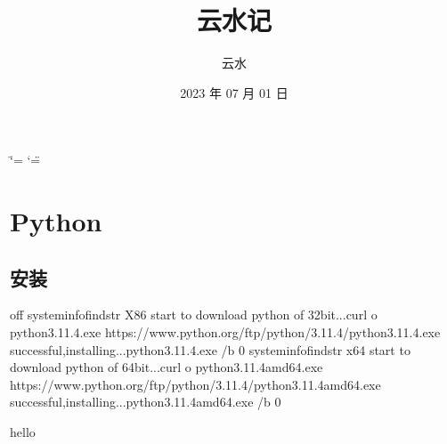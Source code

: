 \documentclass[letterpaper,10pt,english]{sphinxmanual}
\title{云水记}
\date{2023 年 07 月 01 日}
\author{云水}
\begin{document}
\ifdefined\shorthandoff
  \ifnum\catcode`\=\string=\active\shorthandoff{=}\fi
  \ifnum\catcode`\"=\active{}\fi
\fi

\pagestyle{empty}
\sphinxmaketitle
\pagestyle{plain}
\sphinxtableofcontents
\pagestyle{normal}
\label{\detokenize{index::doc}}


\sphinxstepscope


\chapter{Python}
\label{\detokenize{notes/program/python/index:python}}\label{\detokenize{notes/program/python/index::doc}}
\sphinxstepscope


\section{安装}
\label{\detokenize{notes/program/python/install:id1}}\label{\detokenize{notes/program/python/install::doc}}\begin{sphinxalltt}
 off
systeminfofindstr X86 start to download python of 32bit...curl \sphinxhyphen{}o python\sphinxhyphen{}3.11.4.exe https://www.python.org/ftp/python/3.11.4/python\sphinxhyphen{}3.11.4.exe successful,installing...python\sphinxhyphen{}3.11.4.exe /b 0
systeminfofindstr x64 start to download python of 64bit...curl \sphinxhyphen{}o python\sphinxhyphen{}3.11.4\sphinxhyphen{}amd64.exe https://www.python.org/ftp/python/3.11.4/python\sphinxhyphen{}3.11.4\sphinxhyphen{}amd64.exe successful,installing...python\sphinxhyphen{}3.11.4\sphinxhyphen{}amd64.exe /b 0
\end{sphinxalltt}

\sphinxAtStartPar
hello
\end{document}
